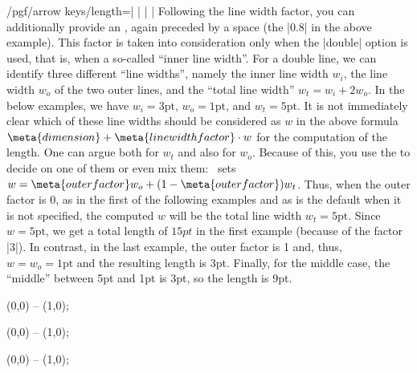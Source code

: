 \begin{key}{/pgf/arrow keys/length=| |%
    | |}
  Following the line width factor, you can additionally provide an
  , again preceded by a space (the |0.8| in the
  above example). This factor is
  taken into consideration only when the |double| option is used, that
  is, when a so-called ``inner line width''. For a double line, we can
  identify three different ``line widths'', namely the inner line
  width $w_i$, the line width  $w_o$ of the two outer lines, and the
  ``total line width'' $w_t = w_i + 2w_o$. In the below examples, we
  have $w_i = 3\mathrm{pt}$, $w_o=1\mathrm{pt}$, and $w_t =
  5\mathrm{pt}$. It is not immediately clear 
  which of these line widths should be considered as $w$ in the above
  formula $\meta{dimension} + \meta{line width factor}\cdot w$ for the
  computation of the length. One can argue both for $w_t$ and also for
  $w_o$. Because of this, you use the  to
  decide on one of them or even 
  mix them: \tikzname\ sets $w = \meta{outer factor} w_o +
  (1-\meta{outer factor})w_t$. Thus, when the outer factor is $0$, as
  in the first of the following examples and as is the default when it
  is not specified, the computed $w$ will be the total
  line width $w_t = 5\mathrm{pt}$. Since
  $w=5\mathrm{pt}$, we get a total length of $15pt$ in the first
  example (because of the factor |3|). In contrast, in the last
  example, the outer factor is 1 and, thus, $w = w_o = \mathrm{1pt}$ and the
  resulting length is 3pt. Finally, for the middle case, the ``middle'' between 5pt and
  1pt is 3pt, so the length is 9pt.
\begin{codeexample}[]
\tikz \draw [line width=1pt, double distance=3pt,
             arrows = {-Latex[length=0pt 3 0]}] (0,0) -- (1,0);
\end{codeexample}
\begin{codeexample}[]
\tikz \draw [line width=1pt, double distance=3pt,
             arrows = {-Latex[length=0pt 3 .5]}] (0,0) -- (1,0);
\end{codeexample}
\begin{codeexample}[]
\tikz \draw [line width=1pt, double distance=3pt,
             arrows = {-Latex[length=0pt 3 1]} ] (0,0) -- (1,0);
\end{codeexample}


\end{key}
